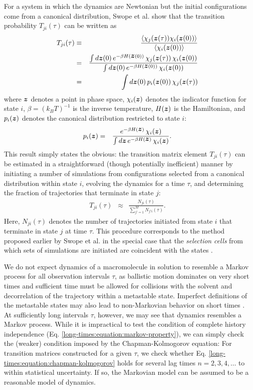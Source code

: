 For a system in which the dynamics are Newtonian but the initial configurations come from a canonical distribution, Swope et al. \cite{swope:2004a} show that the transition probability $T_{ji}(\tau)$ can be written as
\begin{eqnarray}
T_{ji}(\tau) &\equiv& \frac{\langle \chi_j({\mbox{\boldmath{$z$}}}(\tau)) \chi_i({\mbox{\boldmath{$z$}}}(0)) \rangle}{\langle \chi_i({{\mbox{\boldmath{$z$}}}(0)}) \rangle} \nonumber \\
&=& \frac{\int d{\mbox{\boldmath{$z$}}}(0) \, e^{-\beta H({\mbox{\boldmath{$z$}}}(0))} \, \chi_j({\mbox{\boldmath{$z$}}}(\tau)) \, \chi_i({\mbox{\boldmath{$z$}}}(0))}{\int d{\mbox{\boldmath{$z$}}}(0) \, e^{-\beta H({\mbox{\boldmath{$z$}}}(0))} \, \chi_i({\mbox{\boldmath{$z$}}}(0))} \nonumber \\
&=& \int d{\mbox{\boldmath{$z$}}}(0) \, p_i({\mbox{\boldmath{$z$}}}(0)) \, \chi_j({\mbox{\boldmath{$z$}}}(\tau))  
\end{eqnarray}
where ${\mbox{\boldmath{$z$}}}$ denotes a point in phase space, $\chi_i({\mbox{\boldmath{$z$}}})$ denotes the indicator function for state $i$, $\beta = (k_B T)^{-1}$ is the inverse temperature, $H({\mbox{\boldmath{$z$}}})$ is the Hamiltonian, and $p_i({\mbox{\boldmath{$z$}}})$ denotes the canonical distribution restricted to state $i$:
\begin{eqnarray}
p_i({\mbox{\boldmath{$z$}}}) &=& \frac{e^{-\beta H({\mbox{\boldmath{$z$}}})} \, \chi_i({\mbox{\boldmath{$z$}}})}{\int d{\mbox{\boldmath{$z$}}} \, e^{-\beta H({\mbox{\boldmath{$z$}}})} \, \chi_i({\mbox{\boldmath{$z$}}})} .
\end{eqnarray}
This result simply states the obvious: the transition matrix element $T_{ji}(\tau)$ can be estimated in a straightforward (though potentially inefficient) manner by initiating a number of simulations from configurations selected from a canonical distribution within state $i$, evolving the dynamics for a time $\tau$, and determining the fraction of trajectories that terminate in state $j$:
\begin{eqnarray}
T_{ji}(\tau) &\approx& \frac{N_{ji}(\tau)}{\sum\limits_{j'=1}^M N_{j'i}(\tau)} . \label{long-times:equation:transition-element-estimator}
\end{eqnarray}
Here, $N_{ji}(\tau)$ denotes the number of trajectories initiated from state $i$ that terminate in state $j$ at time $\tau$.  This procedure corresponds to the method proposed earlier by Swope et al. in the special case that the \emph{selection cells} from which sets of simulations are initiated are coincident with the states \cite{swope:2004a}.

We do not expect dynamics of a macromolecule in solution to resemble a Markov process for all observation intervals $\tau$, as ballistic motion dominates on very short times and sufficient time must be allowed for collisions with the solvent and decorrelation of the trajectory within a metastable state.
Imperfect definitions of the metastable states may also lead to non-Markovian behavior on short times \cite{swope:2004a}.
At sufficiently long intervals $\tau$, however, we may see that dynamics resembles a Markov process.
While it is impractical to test the condition of complete history independence (Eq. \ref{long-times:equation:markov-property}), we can simply check the (weaker) condition imposed by the Chapman-Kolmogorov equation: For transition matrices constructed for a given $\tau$, we check whether Eq. \ref{long-times:equation:chapman-kolmogorov} holds for several lag times $n = 2, 3, 4, \ldots$ to within statistical uncertainty.  If so, the Markovian model can be assumed to be a reasonable model of dynamics.

